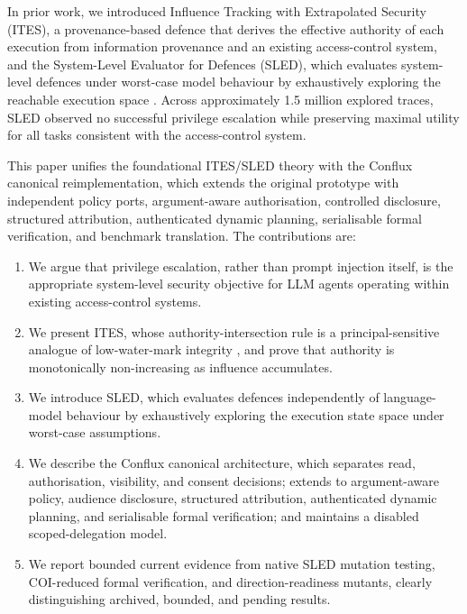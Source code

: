 \documentclass{article}
\begin{document}
In prior work, we introduced Influence Tracking with Extrapolated Security
(ITES), a provenance-based defence that derives the effective authority of
each execution from information provenance and an existing access-control
system, and the System-Level Evaluator for Defences (SLED), which evaluates
system-level defences under worst-case model behaviour by exhaustively
exploring the reachable execution space \citep{earlycategorization}. Across
approximately 1.5 million explored traces, SLED observed no successful
privilege escalation while preserving maximal utility for all tasks
consistent with the access-control system.

This paper unifies the foundational ITES/SLED theory with the Conflux
canonical reimplementation, which extends the original prototype with
independent policy ports, argument-aware authorisation, controlled
disclosure, structured attribution, authenticated dynamic planning,
serialisable formal verification, and benchmark translation. The
contributions are:

\begin{enumerate}
  \item We argue that privilege escalation, rather than prompt injection
    itself, is the appropriate system-level security objective for LLM
    agents operating within existing access-control systems.
  \item We present ITES, whose authority-intersection rule is a
    principal-sensitive analogue of low-water-mark integrity
    \citep{biba1977,lomac}, and prove that authority is monotonically
    non-increasing as influence accumulates.
  \item We introduce SLED, which evaluates defences independently of
    language-model behaviour by exhaustively exploring the execution state
    space under worst-case assumptions.
  \item We describe the Conflux canonical architecture, which separates
    read, authorisation, visibility, and consent decisions; extends to
    argument-aware policy, audience disclosure, structured attribution,
    authenticated dynamic planning, and serialisable formal verification;
    and maintains a disabled scoped-delegation model.
  \item We report bounded current evidence from native SLED mutation
    testing, COI-reduced formal verification, and direction-readiness
    mutants, clearly distinguishing archived, bounded, and pending results.
\end{enumerate}
\end{document}
